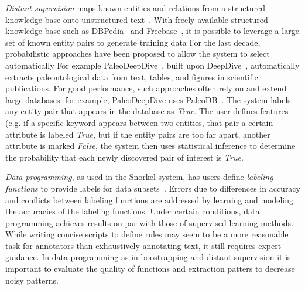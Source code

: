 \textit{Distant supervision} maps known entities and relations from a structured knowledge 
base onto unstructured text~\cite{peters2014machine,zhang2013geodeepdive}. 
With freely available structured knowledge base such as DBPedia~\cite{auer2007dbpedia} and Freebase~\cite{bollacker2008freebase}, it is possible to leverage a large set of known entity pairs to generate training data
For the last decade, probabilistic approaches have been proposed to allow the system to select automatically
For example PaleoDeepDive~\cite{peters2014machine}, built upon DeepDive~\cite{zhang2015deepdive}, automatically extracts
paleontological data from text, tables, and figures in scientific publications. 
For good performance, such approaches often rely on and extend large databases: for example,
PaleoDeepDive uses PaleoDB~\cite{PaleoDB}. 
The system labels any entity pair that appears in the database as \textit{True}.
The user defines features (e.g. if a specific keyword appears between two entities, that pair a certain attribute is labeled \textit{True}, but if the entity pairs are too far apart, another attribute is marked \textit{False}, 
the system then uses statistical inference to determine the probability that each newly discovered pair of interest is \textit{True}.

\textit{Data programming}, as used in the Snorkel system, has users define 
\textit{labeling functions} to provide labels for data subsets~\cite{ratner2016data}. 
Errors due to differences in accuracy and conflicts between labeling functions are 
addressed by learning and modeling the accuracies of the labeling functions. 
Under certain conditions, data programming achieves results on par with those of supervised learning methods.
While writing concise scripts to define rules may seem to be a more reasonable task for annotators 
than exhaustively annotating text, it still requires expert guidance.  
In data programming as in boostrapping and distant supervision it is important to evaluate the quality of functions and extraction patters to decrease noisy patterns.

